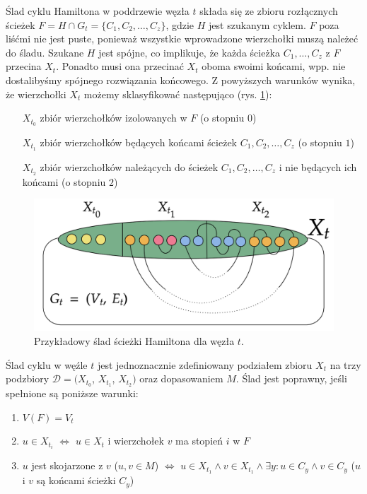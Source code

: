 \documentclass[12pt, oneside]{report}
\begin{document}
Ślad cyklu Hamiltona w poddrzewie węzła $t$ składa się ze zbioru rozłącznych ścieżek $F = H \cap G_t = \{C_1, C_2, \ldots, C_z\}$, gdzie $H$ jest szukanym cyklem. $F$ poza liśćmi nie jest puste, ponieważ wszystkie wprowadzone wierzchołki muszą należeć do śladu. Szukane $H$ jest spójne, co implikuje, że każda ścieżka $C_1, \ldots, C_z$ z $F$ przecina $X_t$. Ponadto musi ona przecinać $X_t$ oboma swoimi końcami, wpp. nie dostalibyśmy spójnego rozwiązania końcowego. Z powyższych warunków wynika, że wierzchołki $X_t$ możemy sklasyfikować następująco (rys. \ref{hamiltonian}):
\begin{itemize}[noitemsep,topsep=5pt,parsep=0pt,partopsep=0pt]
\item[$X_{t_0}$] zbiór wierzchołków izolowanych w $F$ (o stopniu $0$)
\item[$X_{t_1}$] zbiór wierzchołków będących końcami ścieżek $C_1, C_2, \ldots, C_z$ (o stopniu $1$)
\item[$X_{t_2}$] zbiór wierzchołków należących do ścieżek $C_1, C_2, \ldots, C_z$ i nie będących ich końcami (o stopniu $2$)
\end{itemize}

\begin{figure}
\centering
\includegraphics[width=16cm]{hamiltonian.png}
\caption{Przykładowy ślad ścieżki Hamiltona dla węzła $t$.}
\label{hamiltonian}
\end{figure}

Ślad cyklu w węźle $t$ jest jednoznacznie zdefiniowany podziałem zbioru $X_t$ na trzy podzbiory $\mathcal{D} = (X_{t_0}$, $X_{t_1}$, $X_{t_2})$ oraz dopasowaniem $M$. Ślad jest poprawny, jeśli spełnione są poniższe warunki:
\begin{enumerate}[label=(\roman*)]
\item $V(F) = V_t$
\item $u \in X_{t_i}$ $\Leftrightarrow$ $u \in X_t$ i wierzchołek $v$ ma stopień $i$ w $F$
\item $u$ jest skojarzone z $v$ (${u, v} \in M$) $\Leftrightarrow$ $u \in X_{t_1} \wedge v \in X_{t_1} \wedge \exists y: u \in C_y \wedge v \in C_y$ ($u$ i $v$ są końcami ścieżki $C_y$) 
\end{enumerate}  
\end{document}
